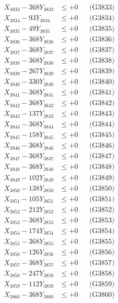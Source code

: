 \documentclass[a4paper,10pt]{article}
\begin{document}
{\begin{align}
X_{3833} - 368Y_{3833} &\leq +0 && \text{(G3833)} \\
X_{3834} - 93Y_{3834} &\leq +0 && \text{(G3834)} \\
X_{3835} - 49Y_{3835} &\leq +0 && \text{(G3835)} \\
X_{3836} - 368Y_{3836} &\leq +0 && \text{(G3836)} \\
X_{3837} - 368Y_{3837} &\leq +0 && \text{(G3837)} \\
X_{3838} - 368Y_{3838} &\leq +0 && \text{(G3838)} \\
X_{3839} - 267Y_{3839} &\leq +0 && \text{(G3839)} \\
X_{3840} - 330Y_{3840} &\leq +0 && \text{(G3840)} \\
\allowbreak
X_{3841} - 368Y_{3841} &\leq +0 && \text{(G3841)} \\
X_{3842} - 368Y_{3842} &\leq +0 && \text{(G3842)} \\
X_{3843} - 137Y_{3843} &\leq +0 && \text{(G3843)} \\
X_{3844} - 368Y_{3844} &\leq +0 && \text{(G3844)} \\
X_{3845} - 158Y_{3845} &\leq +0 && \text{(G3845)} \\
X_{3846} - 368Y_{3846} &\leq +0 && \text{(G3846)} \\
X_{3847} - 368Y_{3847} &\leq +0 && \text{(G3847)} \\
X_{3848} - 368Y_{3848} &\leq +0 && \text{(G3848)} \\
X_{3849} - 102Y_{3849} &\leq +0 && \text{(G3849)} \\
X_{3850} - 138Y_{3850} &\leq +0 && \text{(G3850)} \\
\allowbreak
X_{3851} - 105Y_{3851} &\leq +0 && \text{(G3851)} \\
X_{3852} - 212Y_{3852} &\leq +0 && \text{(G3852)} \\
X_{3853} - 368Y_{3853} &\leq +0 && \text{(G3853)} \\
X_{3854} - 174Y_{3854} &\leq +0 && \text{(G3854)} \\
X_{3855} - 368Y_{3855} &\leq +0 && \text{(G3855)} \\
X_{3856} - 126Y_{3856} &\leq +0 && \text{(G3856)} \\
X_{3857} - 368Y_{3857} &\leq +0 && \text{(G3857)} \\
X_{3858} - 247Y_{3858} &\leq +0 && \text{(G3858)} \\
X_{3859} - 112Y_{3859} &\leq +0 && \text{(G3859)} \\
X_{3860} - 368Y_{3860} &\leq +0 && \text{(G3860)} \\

\end{align}}
\end{document}
